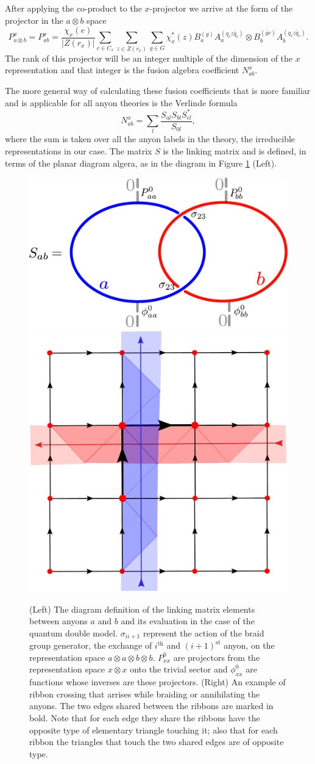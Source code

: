 \documentclass[two column]{article}
\begin{document}
After applying the co-product to the $x$-projector we arrive at the form of the projector in the $a\otimes b$ space
\begin{equation}
	P_{a \otimes b}^x = P_{ab}^x = \frac{\chi_x(e)}{|Z(r_x)|}\sum_{c \in C_x}\sum_{z \in Z(r_x)}\sum_{g\in G}\chi_x^*(z)B_a^{(g)}A_a^{(q_c z \bar{q}_c)}\otimes B_b^{(\bar{g}c)}A_b^{(q_c z \bar{q}_c)}.
\end{equation}
 The rank of this projector will be an integer multiple of the dimension of the $x$ representation and that integer is the fusion algebra coefficient $N_{ab}^x$.
 
 The more general way of calculating these fusion coefficients that is more familiar and is applicable for all anyon theories is the Verlinde formula
 \begin{equation}
 	N_{ab}^x = \sum_{l}\frac{S_{al}S_{bl}S^*_{cl}}{S_{0l}},
 \end{equation}
 where the sum is taken over all the anyon labels in the theory, the irreducible representations in our case. The matrix $S$ is the linking matrix and is defined, in terms of the planar diagram algera, as in the diagram in Figure \ref{fig:S_mat_def} (Left).
 \begin{figure}
 	\centering
 	\includegraphics[width= 0.45\linewidth]{Figures/S_mat_def.pdf}\hspace{10pt}
 	\includegraphics[width= 0.30\linewidth]{Figures/ribbon_crossing.pdf}
 	\caption{(Left) The diagram definition of the linking matrix elements between anyons $a$ and $b$ and its evaluation in the case of the quantum double model. $\sigma_{ii+1}$ represent the action of the braid group generator, the exchange of $i^{\text{th}}$ and $(i+1)^{\text{st}}$ anyon, on the representation space $a \otimes a \otimes b \otimes b$. $P_{xx}^0$ are projectors from the representation space $x \otimes x$ onto the trivial sector and $\phi_{xx}^0$ are functions whose inverses are these projectors. (Right) An example of ribbon crossing that arrises while braiding or annihilating the anyons. The two edges shared between the ribbons are marked in bold. Note that for each edge they share the ribbons have the opposite type of elementary triangle touching it; also that for each ribbon the triangles that touch the two shared edges are of opposite type.}
 	\label{fig:S_mat_def}
 \end{figure}
 
\end{document}
